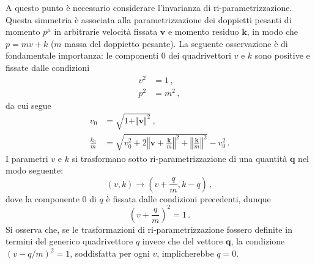 \documentclass{article}
\begin{document}
A questo punto è necessario considerare l'invarianza di ri\hyp{}parametrizzazione. Questa simmetria è associata alla parametrizzazione dei doppietti pesanti di momento $p^\mu$ in arbitrarie velocità fissata $\mathbf{v}$ e momento residuo $\mathbf{k}$, in modo che $p = m v + k$ ($m$ massa del doppietto pesante). La seguente osservazione è di fondamentale importanza: le componenti $0$ dei quadrivettori $v$ e $k$ sono positive e fissate dalle condizioni
\begin{align}
  v^2 &= 1 \, , \\
  p^2 &= m^2 \, ,
\end{align}
da cui segue
\begin{align}
  v_0 &= \sqrt{1 + \Vert \mathbf{v} \Vert^2} \, , \\
  \frac{k_0}{m} &= \sqrt{v_0^2 + 2 \left\Vert \mathbf{v} + \frac{\mathbf{k}}{m} \right\Vert^2 + \left\Vert \frac{\mathbf{k}}{m} \right\Vert^2} - v_0^2 \, .
\end{align}
I parametri $v$ e $k$ si trasformano sotto ri\hyp{}parametrizzazione di una quantità $\mathbf{q}$ nel modo seguente:
\begin{equation}
  (v, k) \to (v + \frac{q}{m}, k - q)  \, ,
\end{equation}
dove la componente $0$ di $q$ è fissata dalle condizioni precedenti, dunque
\begin{equation}
\left( v + \frac{q}{m} \right)^2 = 1 \, .
\end{equation}
Si osserva che, se le trasformazioni di ri\hyp{}parametrizzazione fossero definite in termini del generico quadrivettore $q$ invece che del vettore $\mathbf{q}$, la condizione $(v - q/m)^2 = 1$, soddisfatta per ogni $v$, implicherebbe $q = 0$.
\end{document}
